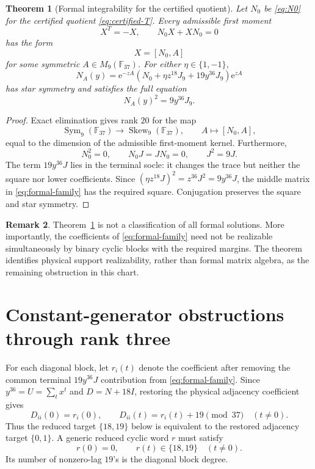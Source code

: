 \documentclass[11pt]{article}
\newtheorem{theorem}{Theorem}[section]
\theoremstyle{definition}
\newtheorem{remark}[theorem]{Remark}
\newcommand{\F}{\mathbb{F}}
\newcommand{\e}{\mathrm{e}}
\begin{document}
\begin{theorem}[Formal integrability for the certified quotient]
\label{thm:formal-completion}
Let \(N_0\) be \eqref{eq:N0} for the certified quotient
\eqref{eq:certified-T}.  Every admissible first moment
\[
 X^T=-X,\qquad N_0X+XN_0=0
\]
has the form
\[
 X=[N_0,A]
\]
for some symmetric \(A\in M_9(\F_{37})\).  For either
\(\eta\in\{1,-1\}\),
\[
 N_A(y)=
 \e^{-zA}
 \left(
 N_0+\eta z^{18}J_9+19y^{36}J_9
 \right)
 \e^{zA}
\tag{7.7}\label{eq:formal-family}
\]
has star symmetry and satisfies the full equation
\[
 N_A(y)^2=9y^{36}J_9.
\]
\end{theorem}

\begin{proof}
Exact elimination gives rank \(20\) for the map
\[
\operatorname{Sym}_9(\F_{37})\longrightarrow
\operatorname{Skew}_9(\F_{37}),
\qquad A\longmapsto[N_0,A],
\]
equal to the dimension of the admissible first-moment kernel.
Furthermore,
\[
N_0^2=0,\qquad N_0J=JN_0=0,\qquad J^2=9J.
\]
The term \(19y^{36}J\) lies in the terminal socle: it changes the trace
but neither the square nor lower coefficients.  Since
\((\eta z^{18}J)^2=z^{36}J^2=9y^{36}J\), the middle matrix in
\eqref{eq:formal-family} has the required square.  Conjugation preserves
the square and star symmetry.
\end{proof}

\begin{remark}
Theorem~\ref{thm:formal-completion} is not a classification of all formal
solutions.  More importantly, the coefficients of
\eqref{eq:formal-family} need not be realizable simultaneously by binary
cyclic blocks with the required margins.  The theorem identifies physical
support realizability, rather than formal matrix algebra, as the remaining
obstruction in this chart.
\end{remark}

\section{Constant-generator obstructions through rank three}
\label{sec:constant-rank}

For each diagonal block, let \(r_i(t)\) denote the coefficient after
removing the common terminal \(19y^{36}J\) contribution from
\eqref{eq:formal-family}.  Since \(y^{36}=U=\sum_t x^t\) and
\(D=N+18I\), restoring the physical adjacency coefficient gives
\[
 D_{ii}(0)=r_i(0),\qquad
 D_{ii}(t)=r_i(t)+19\pmod{37}\quad(t\neq0).
\]
Thus the reduced target \(\{18,19\}\) below is equivalent to the restored
adjacency target \(\{0,1\}\).  A generic reduced cyclic word \(r\) must
satisfy
\[
r(0)=0,\qquad r(t)\in\{18,19\}\quad(t\neq0).
\tag{8.1}\label{eq:binary-diagonal-target}
\]
Its number of nonzero-lag \(19\)'s is the diagonal block degree.
\end{document}
